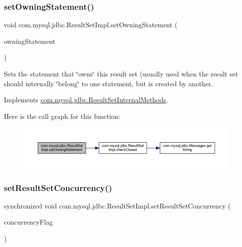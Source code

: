\subsubsection{\texorpdfstring{set\+Owning\+Statement()}{setOwningStatement()}}
{\footnotesize\ttfamily void com.\+mysql.\+jdbc.\+Result\+Set\+Impl.\+set\+Owning\+Statement (\begin{DoxyParamCaption}\item[{\mbox{\hyperlink{classcom_1_1mysql_1_1jdbc_1_1_statement_impl}{com.\+mysql.\+jdbc.\+Statement\+Impl}}}]{owning\+Statement }\end{DoxyParamCaption})}

Sets the statement that \char`\"{}owns\char`\"{} this result set (usually used when the result set should internally \char`\"{}belong\char`\"{} to one statement, but is created by another. 

Implements \mbox{\hyperlink{interfacecom_1_1mysql_1_1jdbc_1_1_result_set_internal_methods_aa3a2a0beee0d27ffa2e05935497b0244}{com.\+mysql.\+jdbc.\+Result\+Set\+Internal\+Methods}}.

Here is the call graph for this function\+:
\nopagebreak
\begin{figure}[H]
\begin{center}
\leavevmode
\includegraphics[width=350pt]{classcom_1_1mysql_1_1jdbc_1_1_result_set_impl_ac318c564fa48174a78268750b91bac73_cgraph}
\end{center}
\end{figure}
\mbox{\label{classcom_1_1mysql_1_1jdbc_1_1_result_set_impl_a92cd52b204364dd65d6a2c3a4d5798a4}} 
\subsubsection{\texorpdfstring{set\+Result\+Set\+Concurrency()}{setResultSetConcurrency()}}
{\footnotesize\ttfamily synchronized void com.\+mysql.\+jdbc.\+Result\+Set\+Impl.\+set\+Result\+Set\+Concurrency (\begin{DoxyParamCaption}\item[{int}]{concurrency\+Flag }\end{DoxyParamCaption})\hspace{0.3cm}{\ttfamily [protected]}}


